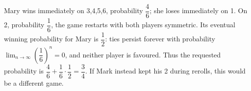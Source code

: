 Mary wins immediately on 3,4,5,6, probability $\dfrac{4}{6}$; she loses immediately on 1. On 2, probability $\dfrac{1}{6}$, the game restarts with both players symmetric. Its eventual winning probability for Mary is $\dfrac{1}{2}$: ties persist forever with probability $\lim_{n\to\infty}(\dfrac{1}{6})^n=0$, and neither player is favoured. Thus the requested probability is $\dfrac{4}{6}+\dfrac{1}{6}\cdot\dfrac{1}{2}=\boxed{\dfrac{3}{4}}$. If Mark instead kept his 2 during rerolls, this would be a different game.
